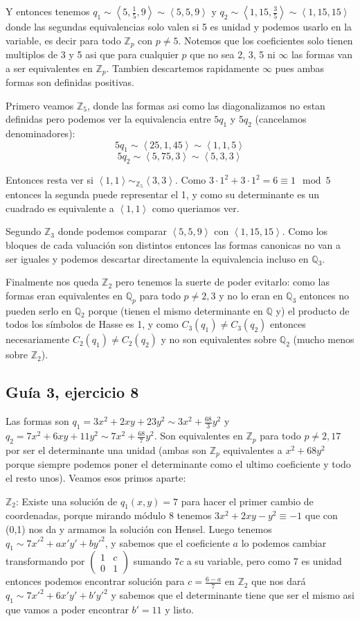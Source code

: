 \documentclass[12pt]{amsart}
\newcommand{\QQ}{\mathbb{Q}}
\newcommand{\ZZ}{\mathbb{Z}}
\newcommand{\lc}{\left<}
\newcommand{\rc}{\right>}
\theoremstyle{plain}
\begin{document}
Y entonces tenemos $q_1 \sim \lc 5,\frac{1}{5},9\rc \sim
\lc 5,5,9\rc$ y $q_2 \sim \lc 1,15,\frac{3}{5}\rc\sim 
\lc 1,15,15\rc$ donde las segundas equivalencias solo valen
si 5 es unidad y podemos usarlo en la variable, es decir
para todo $\ZZ_p$ con $p\neq 5$. Notemos que los coeficientes 
solo tienen multiplos de 3 y 5 asi que para cualquier $p$ que
no sea 2, 3, 5 ni $\infty$ las formas van a ser equivalentes 
en $\ZZ_p$. Tambien descartemos rapidamente $\infty$ pues 
ambas formas son definidas positivas.

Primero veamos $\ZZ_5$, donde las formas asi como las 
diagonalizamos no estan definidas pero podemos ver la 
equivalencia entre $5q_1$ y $5q_2$ (cancelamos 
denominadores):
$$5q_1 \sim \lc 25,1,45\rc\sim\lc 1,1,5\rc$$
$$5q_2 \sim \lc 5,75,3\rc \sim\lc 5,3,3\rc$$

Entonces resta ver si $\lc 1,1\rc\sim_{\ZZ_5}\lc 3,3\rc$. 
Como $3\cdot 1^2+3\cdot 1^2=6\equiv 1 \mod 5$ entonces la 
segunda puede representar el 1, y como su determinante es
un cuadrado es equivalente a $\lc 1,1\rc$ como queriamos ver.

Segundo $\ZZ_3$ donde podemos comparar $\lc 5,5,9\rc$ con 
$\lc 1,15,15\rc$. Como los bloques de cada valuación son 
distintos entonces las formas canonicas no van a ser iguales
y podemos descartar directamente la equivalencia incluso en
$\QQ_3$.

Finalmente nos queda $\ZZ_2$ pero tenemos la suerte de poder
evitarlo: como las formas eran equivalentes en $\QQ_p$ para
todo $p\neq 2,3$ y no lo eran en $\QQ_3$ entonces no pueden 
serlo en $\QQ_2$ porque (tienen el mismo determinante en 
$\QQ$ y) el producto de todos los símbolos de Hasse es 1, y 
como $C_3(q_1)\neq C_3(q_2)$ entonces necesariamente 
$C_2(q_1)\neq C_2(q_2)$ y no son equivalentes sobre $\QQ_2$
(mucho menos sobre $\ZZ_2$). 


\subsection*{Guía 3, ejercicio 8} 
Las formas son $q_1=3x^2+2xy+23y^2\sim 3x^2+\frac{68}{3}y^2$ 
y $q_2=7x^2+6xy+11y^2\sim7x^2+\frac{68}{7}y^2$. Son 
equivalentes en $\ZZ_p$ para todo $p\neq2,17$ por ser el 
determinante una unidad (ambas son $\ZZ_p$ equivalentes 
a $x^2+68y^2$ porque siempre podemos poner el determinante
como el ultimo coeficiente y todo el resto unos). Veamos 
esos primos aparte:

$\ZZ_2$: Existe una solución de $q_1(x,y)=7$ para hacer 
el primer cambio de coordenadas, porque mirando módulo 8 
tenemos $3x^2+2xy-y^2 \equiv -1$ que con (0,1) nos da y 
armamos la solución con Hensel. Luego
tenemos $q_1 \sim 7x'^2 + ax'y' + by'^2$, y sabemos que el 
coeficiente $a$ lo podemos cambiar transformando por 
$\left(\begin{smallmatrix} 1 & c \\ 0 & 1 \end{smallmatrix}
\right)$ sumando $7c$ a su variable, pero como 7 es unidad
entonces podemos encontrar solución para $c = \frac{6-a}{7}$ 
en $\ZZ_2$ que nos dará $q_1\sim 7x'^2 + 6x'y' + b'y'^2$ y 
sabemos que el determinante tiene que ser el mismo asi que 
vamos a poder encontrar $b'= 11$ y listo.
\end{document}
